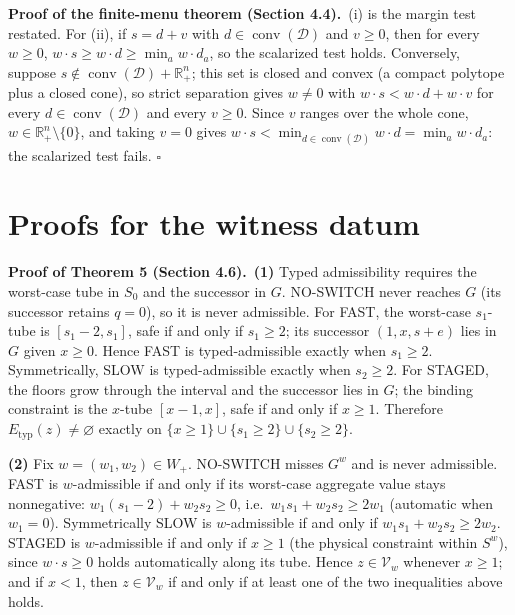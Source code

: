 \documentclass[review,11pt]{elsarticle}
\begin{document}
\textbf{Proof of the finite-menu theorem (Section 4.4).}\ (i) is the margin test restated. For (ii), if
\(s = d + v\) with \(d \in \operatorname{conv}(\mathcal{D})\) and \(v \ge 0\), then
for every \(w \ge 0\), \(w \cdot s \ge w \cdot d \ge \min_a w \cdot d_a\),
so the scalarized test holds. Conversely, suppose
\(s \notin \operatorname{conv}(\mathcal{D}) + \mathbb{R}^n_+\); this set is closed
and convex (a compact polytope plus a closed cone), so strict separation
gives \(w \ne 0\) with \(w \cdot s < w \cdot d + w \cdot v\) for every
\(d \in \operatorname{conv}(\mathcal{D})\) and every \(v \ge 0\). Since \(v\)
ranges over the whole cone, \(w \in \mathbb{R}^n_+ \setminus \{0\}\), and
taking \(v = 0\) gives
\(w \cdot s < \min_{d \in \operatorname{conv}(\mathcal{D})} w \cdot d =
\min_a w \cdot d_a\): the scalarized test fails. \ensuremath{\square}

\section{Proofs for the witness datum}

\textbf{Proof of Theorem 5 (Section 4.6).}\ \textbf{(1)} Typed admissibility requires the worst-case
tube in \(S_0\) and the successor in \(G\). NO-SWITCH never reaches
\(G\) (its successor retains \(q = 0\)), so it is never admissible. For
FAST, the worst-case \(s_1\)-tube is \([s_1 - 2, s_1]\), safe if and
only if \(s_1 \ge 2\); its successor \((1, x, s + e)\) lies in \(G\)
given \(x \ge 0\). Hence FAST is typed-admissible exactly when
\(s_1 \ge 2\). Symmetrically, SLOW is typed-admissible exactly when
\(s_2 \ge 2\). For STAGED, the floors grow through the interval and the
successor lies in \(G\); the binding constraint is the \(x\)-tube
\([x - 1, x]\), safe if and only if \(x \ge 1\). Therefore
\(E_{\mathrm{typ}}(z) \neq \varnothing\) exactly on
\(\{x \ge 1\} \cup \{s_1 \ge 2\} \cup \{s_2 \ge 2\}\).

\textbf{(2)} Fix \(w = (w_1, w_2) \in W_+\). NO-SWITCH misses \(G^w\)
and is never admissible. FAST is \(w\)-admissible if and only if its
worst-case aggregate value stays nonnegative:
\(w_1(s_1 - 2) + w_2 s_2 \ge 0\), i.e.~\(w_1 s_1 + w_2 s_2 \ge 2 w_1\)
(automatic when \(w_1 = 0\)). Symmetrically SLOW is \(w\)-admissible if
and only if \(w_1 s_1 + w_2 s_2 \ge 2 w_2\). STAGED is \(w\)-admissible
if and only if \(x \ge 1\) (the physical constraint within \(S^w\)),
since \(w \cdot s \ge 0\) holds automatically along its tube. Hence
\(z \in \mathcal{V}_w\) whenever \(x \ge 1\); and if \(x < 1\), then
\(z \in \mathcal{V}_w\) if and only if at least one of the two
inequalities above holds.
\end{document}
